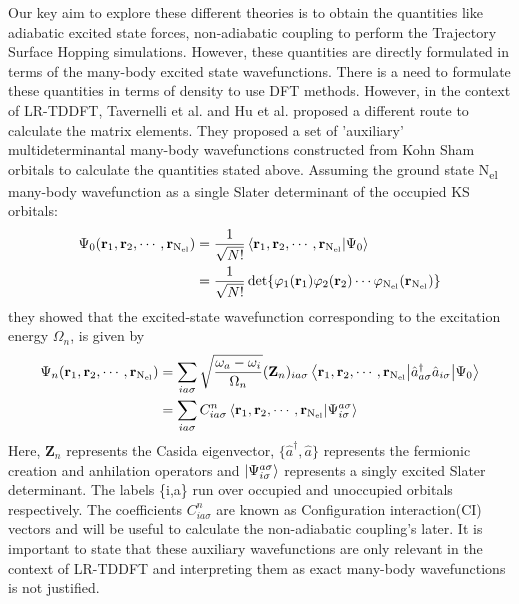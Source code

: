 Our key aim to explore these different theories is to obtain the quantities like adiabatic excited state forces, non-adiabatic coupling to perform the Trajectory Surface Hopping simulations. However, these quantities are directly formulated in terms of the many-body excited state wavefunctions. There is a need to formulate these quantities in terms of density to use DFT methods. However, in the context of LR-TDDFT, Tavernelli et al.\cite{Tavernelli} and Hu et al.\cite{hu_et_al_1,hu_et_al_2} proposed a different route to calculate the matrix elements. They proposed a set of 'auxiliary' multideterminantal many-body wavefunctions constructed from Kohn Sham orbitals to calculate the quantities stated above. Assuming the ground state N\textsubscript{el} many-body wavefunction as a single Slater determinant of the occupied KS orbitals:
\begin{align}
    \Psi_0(\mathbf{r}_1,\mathbf{r}_2,\cdots,\mathbf{r}_{\text{N\textsubscript{el}}}) &= \frac{1}{\sqrt{N!}}\ip{\mathbf{r}_1,\mathbf{r}_2,\cdots,\mathbf{r}_{\text{N\textsubscript{el}}}}{\Psi_0} \\
    &=  \frac{1}{\sqrt{N!}}\det\{\varphi_1(\mathbf{r}_1)\varphi_2(\mathbf{r}_2)\cdots\varphi_{\text{N\textsubscript{el}}}(\mathbf{r}_{\text{N\textsubscript{el}}})\}
\end{align}
they showed that the excited-state wavefunction corresponding to the excitation energy $\Omega_n$, is given by
\begin{align}
    \Psi_n(\mathbf{r}_1,\mathbf{r}_2,\cdots,\mathbf{r}_{\text{N\textsubscript{el}}}) &= \sum_{ia\sigma}\sqrt{\frac{\omega_a-\omega_i}{\Omega_n}}(\mathbf{Z}_n)_{ia\sigma}\mel**{\mathbf{r}_1,\mathbf{r}_2,\cdots,\mathbf{r}_{\text{N\textsubscript{el}}}}{\hat{a}^\dagger_{a\sigma}\hat{a}_{i\sigma}}{\Psi_0} \\
    &= \sum_{ia\sigma}C^n_{ia\sigma}\ip{\mathbf{r}_1,\mathbf{r}_2,\cdots,\mathbf{r}_{\text{N\textsubscript{el}}}}{\Psi_{i\sigma}^{a\sigma}}
\end{align}
Here, $\mathbf{Z}_n$ represents the Casida eigenvector, $\{\hat{a}^\dagger,\hat{a}\}$ represents the fermionic creation and anhilation operators and $\ket{\Psi_{i\sigma}^{a\sigma}}$ represents a singly excited Slater determinant. The labels \{i,a\} run over occupied and unoccupied orbitals respectively. The coefficients $C^n_{ia\sigma}$ are known as Configuration interaction(CI) vectors and will be useful to calculate the non-adiabatic coupling's later. It is important to state that these auxiliary wavefunctions are only relevant in the context of LR-TDDFT and interpreting them as exact many-body wavefunctions is not justified.  